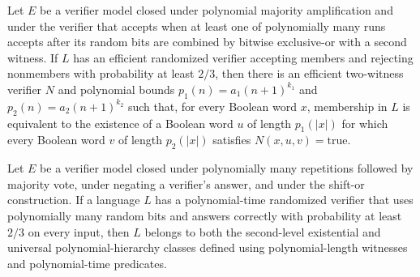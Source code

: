 \begin{theorem}
\label{Randomized.bpp_subset_sigma2}
\leanok
{}
Let $E$ be a verifier model closed under polynomial majority amplification and under the
verifier that accepts when at least one of polynomially many runs accepts after its
random bits are combined by bitwise exclusive-or with a second witness. If $L$ has an
efficient randomized verifier accepting members and rejecting nonmembers with
probability at least $2/3$, then there is an efficient two-witness verifier $N$ and
polynomial bounds $p_1(n)=a_1(n+1)^{k_1}$ and $p_2(n)=a_2(n+1)^{k_2}$ such that, for
every Boolean word $x$, membership in $L$ is equivalent to the existence of a Boolean
word $u$ of length $p_1(|x|)$ for which every Boolean word $v$ of length $p_2(|x|)$
satisfies $N(x,u,v)=\mathrm{true}$.
\end{theorem}

\begin{theorem}
\label{Randomized.sipser_gacs}
\leanok
{}
Let $E$ be a verifier model closed under polynomially many repetitions followed by
majority vote, under negating a verifier's answer, and under the shift-or construction.
If a language $L$ has a polynomial-time randomized verifier that uses polynomially many
random bits and answers correctly with probability at least $2/3$ on every input, then
$L$ belongs to both the second-level existential and universal polynomial-hierarchy
classes defined using polynomial-length witnesses and polynomial-time predicates.
\end{theorem}
